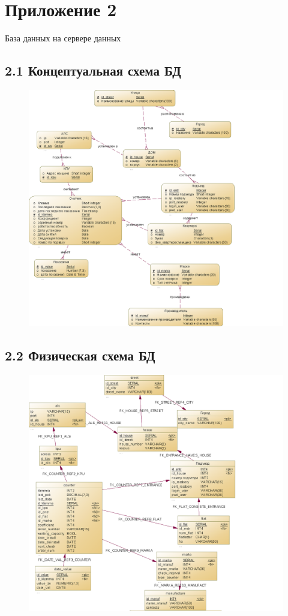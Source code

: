 \documentclass[a4paper,12pt]{article}
\begin{document}
\pagebreak

\section*{ \centering Приложение 2} 

\begin{center}
	База данных на сервере данных
\end{center}

\subsection*{2.1 Концептуальная схема БД}
\begin{figure}[H]
	\centering
	\includegraphics[width=1.2\linewidth]{pics/pril1} 
\end{figure}

\pagebreak

\subsection*{2.2 Физическая схема БД}
\begin{figure}[H]
	\centering
	\includegraphics[width=1.2\linewidth]{pics/pril2} 
\end{figure}
\end{document}
